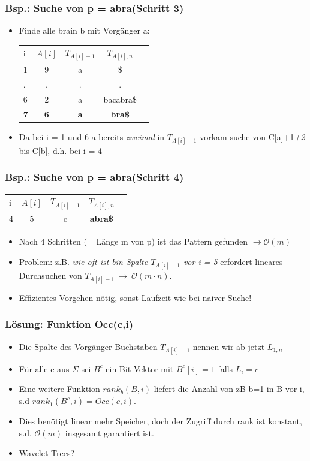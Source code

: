 \documentclass{beamer}
\begin{document}
\begin{frame}
\frametitle{Bsp.: Suche von p = \glqq abra\grqq (Schritt 3)}
\begin{itemize}
\item Finde alle bra\grqq  in b mit Vorgänger \glqq a\grqq:
\begin{tabular}{l c cc r}
i & $A[i]$ & $T_{A[i]-1}$ & $T_{A[i],n}$\\
1 & 9 & a & \$ \\
. & . & . & .\\
6 & 2 & a & bacabra\$ \\
\textbf{7} & \textbf{6}  & \color{red}\textbf{a} & \textbf{bra\$} \\
\end{tabular}
\item Da bei i = 1 und 6 a bereits \textit{zweimal} in $T_{A[i]-1}$ vorkam \textrightarrow suche von C[\glqq a\grqq]+1\textit{+2} bis C[\glqq b\grqq], d.h. bei i = 4
\end{itemize}
\end{frame}
\begin{frame}
\frametitle{Bsp.: Suche von p = \glqq abra\grqq  (Schritt 4)}
\begin{tabular}{l c cc r}
i & $A[i]$ & $T_{A[i]-1}$ & $T_{A[i],n}$\\
4 & 5 & c & \color{red}\textbf{abra\$} \\
\end{tabular}
\begin{itemize}
\item Nach 4 Schritten (= Länge m von p) ist das Pattern gefunden $\rightarrow \mathcal{O}(m)$
\item Problem: z.B. \textit{wie oft ist \glqq b\grqq  in Spalte $T_{A[i]-1}$ vor i = 5} erfordert lineares Durchsuchen von $T_{A[i]-1}\ \rightarrow\ \mathcal{O}(m\cdot n)$.
\item Effizientes Vorgehen nötig, sonst Laufzeit wie bei naiver Suche!
\end{itemize}
\end{frame}
\begin{frame}
\frametitle{Lösung: Funktion Occ(c,i)}
\begin{itemize}
\item Die Spalte des Vorgänger-Buchstaben $T_{A[i]-1}$ nennen wir ab jetzt $L_{1,n}$
\item Für alle c aus $\Sigma$ sei $B^{c}$ ein Bit-Vektor mit $B^{c}[i] = 1$ falls $L_{i} = c$
\item Eine weitere Funktion $rank_{b}(B,i)$ liefert die Anzahl von zB b=1 in B vor i, s.d $rank_{1}(B^{c},i) = Occ(c,i)$.
\item Dies benötigt linear mehr Speicher, doch der Zugriff durch rank ist konstant, s.d. $\mathcal{O}(m)$ insgesamt garantiert ist.
\item Wavelet Trees?
\end{itemize}
\end{frame}
\end{document}
